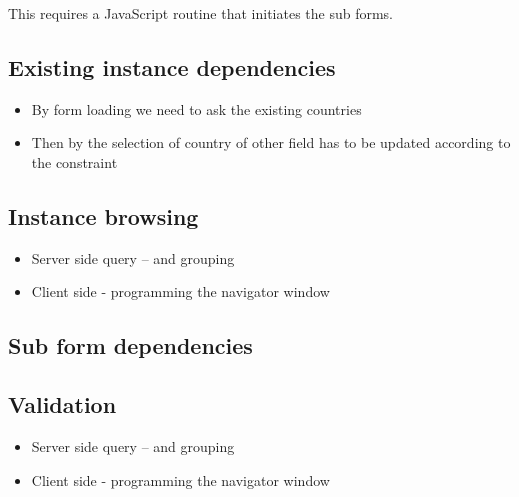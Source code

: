 This requires a JavaScript routine that initiates the sub forms. 



\subsection{Existing instance dependencies}



\begin{itemize}
	\item	By form loading we need to ask the existing countries
	\item 	Then by the selection of country of other field has to be updated according to the constraint
\end{itemize}


\subsection{Instance browsing}


\begin{itemize}
	\item Server side query – and grouping
	\item Client side - programming the navigator window
\end{itemize}

\subsection{Sub form dependencies}
	




\subsection{Validation}
	
\begin{itemize}
	\item Server side query – and grouping
	\item Client side - programming the navigator window
\end{itemize}	
	
	
	
	
	
